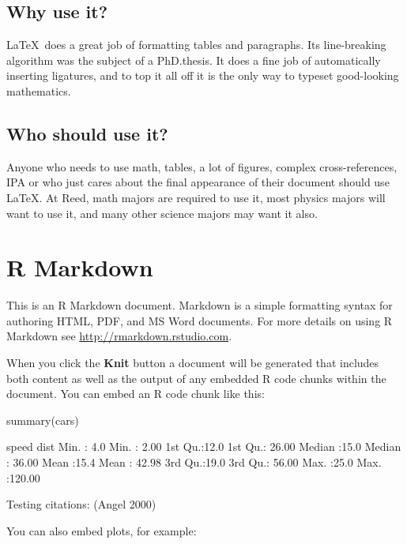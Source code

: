 \documentclass[12pt,twoside]{reedthesis}
\begin{document}
  \section{Why use it?}

  \LaTeX~does a great job of formatting tables and paragraphs. Its
  line-breaking algorithm was the subject of a PhD.\thinspace thesis. It
  does a fine job of automatically inserting ligatures, and to top it all
  off it is the only way to typeset good-looking mathematics.

  \section{Who should use it?}

  Anyone who needs to use math, tables, a lot of figures, complex
  cross-references, IPA or who just cares about the final appearance of
  their document should use \LaTeX. At Reed, math majors are required to
  use it, most physics majors will want to use it, and many other science
  majors may want it also.

  \chapter{R Markdown}

  This is an R Markdown document. Markdown is a simple formatting syntax
  for authoring HTML, PDF, and MS Word documents. For more details on
  using R Markdown see \url{http://rmarkdown.rstudio.com}.

  When you click the \textbf{Knit} button a document will be generated
  that includes both content as well as the output of any embedded R code
  chunks within the document. You can embed an R code chunk like this:

  \begin{CodeChunk}
  \begin{CodeInput}
  summary(cars)
  \end{CodeInput}
  \begin{CodeOutput}
       speed           dist
   Min.   : 4.0   Min.   :  2.00
   1st Qu.:12.0   1st Qu.: 26.00
   Median :15.0   Median : 36.00
   Mean   :15.4   Mean   : 42.98
   3rd Qu.:19.0   3rd Qu.: 56.00
   Max.   :25.0   Max.   :120.00
  \end{CodeOutput}
  \end{CodeChunk}

  Testing citations: \cite{angel2000} (Angel 2000)

  You can also embed plots, for example:
\end{document}

